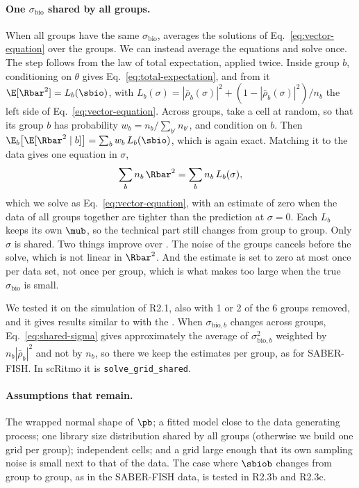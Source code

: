 \paragraph{One $\sigma_{\text{bio}}$ shared by all groups.}

When all groups have the same $\sigma_{\text{bio}}$,  averages the solutions of Eq.~\eqref{eq:vector-equation} over the groups. We can instead average the equations and solve once. The step follows from the law of total expectation, applied twice. Inside group $b$, conditioning on $\theta$ gives Eq.~\eqref{eq:total-expectation}, and from it $\E[\Rbar^2] = L_b(\sbio)$, with $L_b(\sigma) = |\bar\rho_b(\sigma)|^2 + (1 - |\bar\rho_b(\sigma)|^2)/n_b$ the left side of Eq.~\eqref{eq:vector-equation}. Across groups, take a cell at random, so that its group $b$ has probability $w_b = n_b/\sum_{b'} n_{b'}$, and condition on $b$. Then $\E_b\big[\E[\Rbar^2 \mid b]\big] = \sum_b w_b\, L_b(\sbio)$, which is again exact. Matching it to the data gives one equation in $\sigma$,
\begin{equation}
\sum_b n_b\, \Rbar^2 = \sum_b n_b\, L_b(\sigma) ,
\label{eq:shared-sigma}
\end{equation}
which we solve as Eq.~\eqref{eq:vector-equation}, with an estimate of zero when the data of all groups together are tighter than the prediction at $\sigma = 0$. Each $L_b$ keeps its own $\mub$, so the technical part still changes from group to group. Only $\sigma$ is shared. Two things improve over . The noise of the groups cancels before the solve, which is not linear in $\Rbar^2$. And the estimate is set to zero at most once per data set, not once per group, which is what makes  too large when the true $\sigma_{\text{bio}}$ is small.

We tested it on the simulation of R2.1, also with 1 or 2 of the 6 groups removed, and it gives results similar to  with the \gridmethod. When $\sigma_{\text{bio},b}$ changes across groups, Eq.~\eqref{eq:shared-sigma} gives approximately the average of $\sigma_{\text{bio},b}^2$ weighted by $n_b|\bar\rho_b|^2$ and not by $n_b$, so there we keep the estimates per group, as for SABER-FISH. In scRitmo it is \texttt{solve\_grid\_shared}.

\paragraph{Assumptions that remain.}

The wrapped normal shape of $\pb$; a fitted model close to the data generating process; one library size distribution shared by all groups (otherwise we build one grid per group); independent cells; and a grid large enough that its own sampling noise is small next to that of the data. The case where $\sbiob$ changes from group to group, as in the SABER-FISH data, is tested in R2.3b and R2.3c.
